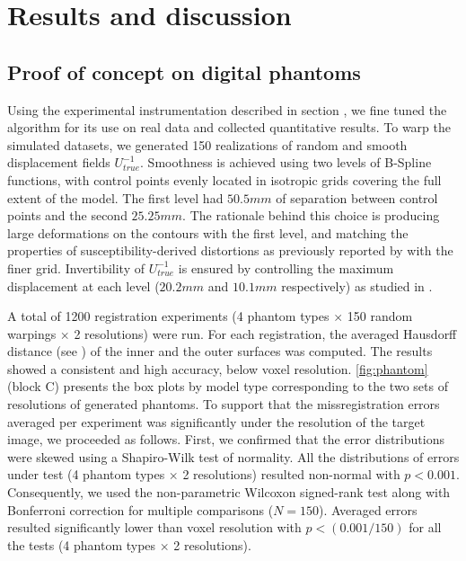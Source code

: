 \section*{Results and discussion}
\label{sec:results}

\subsection*{Proof of concept on digital phantoms}
\label{sec:results_phantom}
Using the experimental instrumentation described in section ,
  we fine tuned the algorithm for its use on real data and collected quantitative results.
To warp the simulated datasets, we generated 150 realizations of random and smooth displacement
  fields $U^{-1}_{true}$.
Smoothness is achieved using two levels of B-Spline functions, with control points evenly
  located in isotropic grids covering the full extent of the model.
The first level had $50.5mm$ of separation between control points and the second $25.25mm$.
The rationale behind this choice is producing large deformations on the contours with
  the first level, and matching the properties of susceptibility-derived distortions
  as previously reported by \cite{irfanoglu_susceptibility_2011} with the finer grid.
Invertibility of $U^{-1}_{true}$ is ensured by controlling the maximum displacement at each
  level ($20.2mm$ and $10.1mm$ respectively) as studied in \citep{rueckert_diffeomorphic_2006}.

A total of 1200 registration experiments (4 phantom types $\times$ 150 random warpings
  $\times$ 2 resolutions) were run.
For each registration, the averaged Hausdorff distance (see )
  of the inner and the outer surfaces was computed.
The results showed a consistent and high accuracy, below voxel resolution.
\autoref{fig:phantom} (block C) presents the box plots by model type corresponding
  to the two sets of resolutions of generated phantoms.
To support that the missregistration errors averaged per experiment was significantly
  under the resolution of the target image, we proceeded as follows.
First, we confirmed that the error distributions were skewed using a Shapiro-Wilk test of
  normality.
All the distributions of errors under test (4 phantom types $\times$ 2 resolutions) resulted
  non-normal with $p<0.001$.
Consequently, we used the non-parametric Wilcoxon signed-rank test along with Bonferroni
  correction for multiple comparisons ($N=150$).
Averaged errors resulted significantly lower than voxel resolution with $p < (0.001 / 150)$
  for all the tests (4 phantom types $\times$ 2 resolutions).

